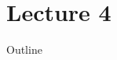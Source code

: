 \documentclass{beamer}
\begin{document}
\part{Lecture 4}

\begin{frame}
	\titlepage
	\resetonslide
\end{frame}




\begin{frame}{Outline}
	\tableofcontents[part=4]
\end{frame}
\end{document}
